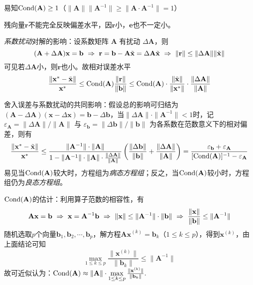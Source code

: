\entry 易知$\operatorname{Cond}(\mathbf{A})\geq1$（$\|\mathbf{A}\|\|\mathbf{A}^{-1}\|\geq\|\mathbf{A\cdot A}^{-1}\|=1$）

\entry 残向量$\mathbf{r}$不能完全反映偏差水平，因$\mathbf{r}$小，$\mathbf{e}$也不一定小。

\entry \emph{系数扰动}对解的影响：设系数矩阵 $\mathbf{A}$ 有扰动 $\Delta\mathbf{A}$，则
\[(\mathbf{A}+\Delta\mathbf{A})\mathbf{x=b}\ \Rightarrow\ \mathbf{r=b-A}\tilde{\mathbf{x}}=\Delta\mathbf{A}\tilde{\mathbf{x}}\ \Rightarrow\ \|\mathbf{r}\|\leq\|\Delta\mathbf{A}\|\|\tilde{\mathbf{x}}\|\]
可见若$\Delta\mathbf{A}$小，则$\mathbf{r}$也小。故相对误差水平
\[\frac{\|\mathbf{x}^{\ast}-\tilde{\mathbf{x}}\|}{\mathbf{x}^{\ast}}\leq\operatorname{Cond}(\mathbf{A})\frac{\|\mathbf{r}\|}{\|\mathbf{b}\|}\leq\operatorname{Cond}(\mathbf{A})\cdot\frac{\|\tilde{\mathbf{x}}\|}{\|\mathbf{x}^{\ast}\|}\cdot\frac{\|\Delta\mathbf{A}\|}{\|\mathbf{A}\|}\]

\entry 舍入误差与系数扰动的共同影响：假设总的影响可归结为 $(\mathbf{A}-\Delta\mathbf{A})(\mathbf{x}-\Delta\mathbf{x})=\mathbf{b}-\Delta\mathbf{b}$，当$\|\Delta\mathbf{A}\|\cdot\|\mathbf{A}^{-1}\|<1$时，记 $\varepsilon_{\mathbf{A}}=\|\Delta\mathbf{A}\|/\|\mathbf{A}\|$ 与 $\varepsilon_{\mathbf{b}}=\|\Delta\mathbf{b}\|/\|\mathbf{b}\|$ 为各系数在范数意义下的相对偏差，则有
\begin{equation}
\frac{\|\mathbf{x}^{\ast}-\tilde{\mathbf{x}}\|}{\mathbf{x}^{\ast}}\leq\frac{\|\mathbf{A}^{-1}\|\cdot\|\mathbf{A}\|}{1-\|\mathbf{A}^{-1}\|\cdot\|\mathbf{A}\|\cdot\frac{\|\Delta\mathbf{A}\|}{\|\mathbf{A}\|}}\left(\frac{\|\Delta\mathbf{b}\|}{\|\mathbf{b}\|}+\frac{\|\Delta\mathbf{A}\|}{\|\mathbf{A}\|}\right)=\frac{\varepsilon_{\mathbf{b}}+\varepsilon_{\mathbf{A}}}{[\operatorname{Cond}(\mathbf{A})]^{-1}-\varepsilon_{\mathbf{A}}}
\end{equation}
易见当$\operatorname{Cond}(\mathbf{A})$较大时，方程组为\emph{病态方程组}；反之，当$\operatorname{Cond}(\mathbf{A})$较小时，方程组仍为\emph{良态方程组}。

\entry $\operatorname{Cond}(\mathbf{A})$的估计：利用算子范数的相容性，有
\[\mathbf{Ax=b}\ \Rightarrow\ \mathbf{x=A}^{-1}\mathbf{b}\ \Rightarrow\ \|\mathbf{x}\|\leq\|\mathbf{A}^{-1}\|\cdot\|\mathbf{b}\|\ \Rightarrow\ \frac{\|\mathbf{x}\|}{\|\mathbf{b}\|}\leq\|\mathbf{A}^{-1}\|\]
随机选取$p$个向量$\mathbf{b}_1,\mathbf{b}_2,\cdots,\mathbf{b}_p$，解方程$\mathbf{Ax}^{(k)}=\mathbf{b}_k$（$1\leq k\leq p$），得到$\mathbf{x}^{(k)}$，由上面结论可知
\[\max_{1\leq k\leq p}\frac{\|\mathbf{x}^{(k)}\|}{\|\mathbf{b}_k\|}\leq\|\mathbf{A}^{-1}\|\]
故可近似认为：$\operatorname{Cond}(\mathbf{A})\approx\|\mathbf{A}\|\cdot\max\limits_{1\leq k\leq p}\frac{\|\mathbf{x}^{(k)}\|}{\|\mathbf{b}_k\|}.$
